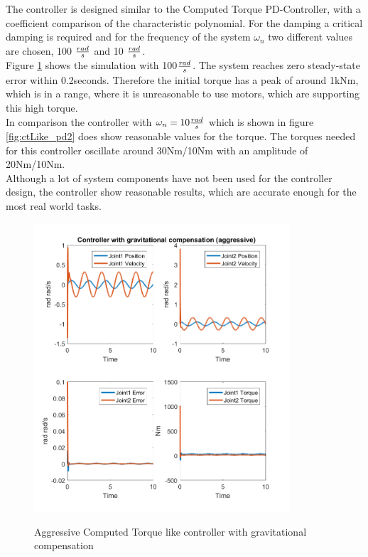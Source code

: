 The controller is designed similar to the Computed Torque PD-Controller, with a coefficient comparison of the characteristic polynomial. For the damping a critical damping is required and for the frequency of the system $\omega_n$ two different values are chosen, 100 ${rad \over s}$ and 10 ${rad \over s}$.\\
Figure \ref{fig:ctLike_pd1} shows the simulation with 100${rad \over s}$. The system reaches zero steady-state error within 0.2seconds. Therefore the initial torque has a peak of around 1kNm, which is in a range, where it is unreasonable to use motors, which are supporting this high torque. \\
In comparison the controller with $\omega_n = 10 {rad \over s} $ which is shown in figure \ref{fig:ctLike_pd2} does show reasonable values for the torque. The torques needed for this controller oscillate around 30Nm/10Nm with an amplitude of 20Nm/10Nm.\\
Although a lot of system components have not been used for the controller design, the controller show reasonable results, which are accurate enough for the most real world tasks.

\begin{figure}[]
	\centering
	\includegraphics[width=0.85\textwidth]{pics/Controllerwithgravitationalcompensation(aggressive).png}\\
	\caption{Aggressive Computed Torque like controller with gravitational compensation}
	\label{fig:ctLike_pd1}
\end{figure}

